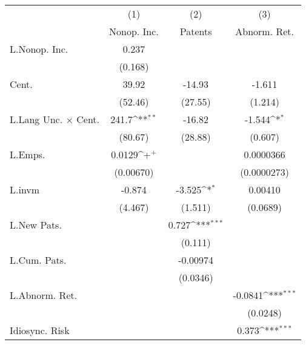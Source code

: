{
\def\sym#1{\ifmmode^{#1}\else\(^{#1}\)\fi}
\begin{tabular}{l*{3}{c}}
\hline\hline
                    &\multicolumn{1}{c}{(1)}&\multicolumn{1}{c}{(2)}&\multicolumn{1}{c}{(3)}\\
                    &\multicolumn{1}{c}{Nonop. Inc.}&\multicolumn{1}{c}{Patents}&\multicolumn{1}{c}{Abnorm. Ret.}\\
\hline
L.Nonop. Inc.       &       0.237         &                     &                     \\
                    &     (0.168)         &                     &                     \\
Cent.               &       39.92         &      -14.93         &      -1.611         \\
                    &     (52.46)         &     (27.55)         &     (1.214)         \\
L.Lang Unc. $\times$ Cent.&       241.7\sym{**} &      -16.82         &      -1.544\sym{*}  \\
                    &     (80.67)         &     (28.88)         &     (0.607)         \\
L.Emps.             &      0.0129\sym{+}  &                     &   0.0000366         \\
                    &   (0.00670)         &                     & (0.0000273)         \\
L.invm              &      -0.874         &      -3.525\sym{*}  &     0.00410         \\
                    &     (4.467)         &     (1.511)         &    (0.0689)         \\
L.New Pats.         &                     &       0.727\sym{***}&                     \\
                    &                     &     (0.111)         &                     \\
L.Cum. Pats.        &                     &    -0.00974         &                     \\
                    &                     &    (0.0346)         &                     \\
L.Abnorm. Ret.      &                     &                     &     -0.0841\sym{***}\\
                    &                     &                     &    (0.0248)         \\
Idiosync. Risk      &                     &                     &       0.373\sym{***}\\

\end{tabular}}
